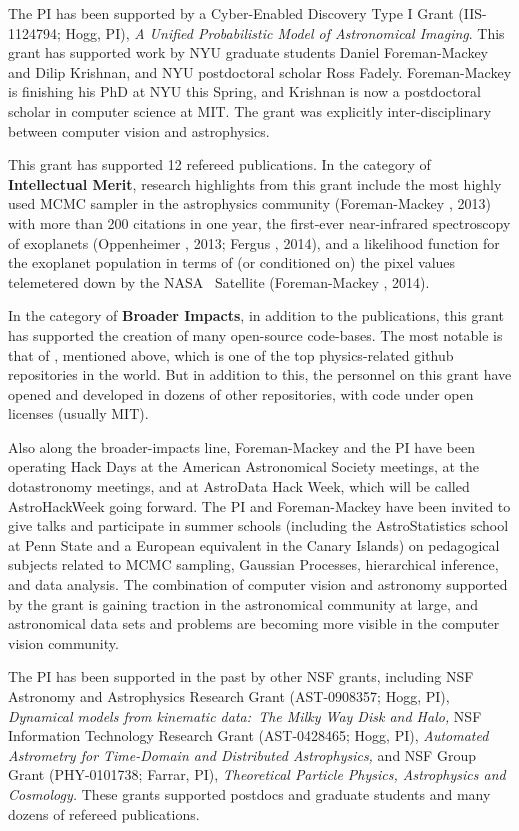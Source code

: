 \documentclass[12pt]{article}
\begin{document}
The PI has been supported by a Cyber-Enabled Discovery Type I Grant
(IIS-1124794; Hogg, PI), \textit{A Unified Probabilistic Model of
  Astronomical Imaging}.
This grant has supported work by NYU graduate students Daniel
Foreman-Mackey and Dilip Krishnan, and NYU postdoctoral scholar Ross
Fadely.
Foreman-Mackey is finishing his PhD at NYU this Spring, and Krishnan
is now a postdoctoral scholar in computer science at MIT.
The grant was explicitly inter-disciplinary between computer vision
and astrophysics.

This grant has supported 12 refereed publications.
In the category of \textbf{Intellectual Merit},
research highlights from this grant include the most highly used MCMC
sampler in the astrophysics community (Foreman-Mackey \etal, 2013)
with more than 200 citations in one year, the
first-ever near-infrared spectroscopy of exoplanets (Oppenheimer \etal, 2013;
Fergus \etal, 2014), and a likelihood function for the exoplanet population
in terms of (or conditioned on) the pixel values telemetered down by
the NASA \kepler\ Satellite (Foreman-Mackey \etal, 2014).

In the category of \textbf{Broader Impacts},
in addition to the publications, this grant has supported the creation of
many open-source code-bases.
The most notable is that of , mentioned above, which is
one of the top physics-related github repositories in the world.
But in addition to this, the personnel on this grant have opened and
developed in dozens of other repositories, with code under open
licenses (usually MIT).

Also along the broader-impacts line, Foreman-Mackey and the PI have
been operating Hack Days at the American Astronomical Society
meetings, at the dotastronomy meetings, and at AstroData Hack Week,
which will be called AstroHackWeek going forward.
The PI and Foreman-Mackey have been invited to give talks and
participate in summer schools (including the AstroStatistics school at
Penn State and a European equivalent in the Canary Islands) on
pedagogical subjects related to MCMC sampling, Gaussian Processes,
hierarchical inference, and data analysis.
The combination of computer vision and astronomy supported by the
grant is gaining traction in the astronomical community at large, and
astronomical data sets and problems are becoming more visible in the
computer vision community.

The PI has been supported in the past by other NSF grants, including
NSF Astronomy and Astrophysics Research Grant (AST-0908357; Hogg, PI),
\textit{Dynamical models from kinematic data:\ The Milky Way Disk and Halo,}
NSF Information Technology Research Grant (AST-0428465; Hogg, PI),
\textit{Automated Astrometry for Time-Domain and Distributed
Astrophysics,} and
NSF Group Grant (PHY-0101738; Farrar, PI), \textit{Theoretical
Particle Physics, Astrophysics and Cosmology.}
These grants supported postdocs and graduate students and many dozens
of refereed publications.
\end{document}
